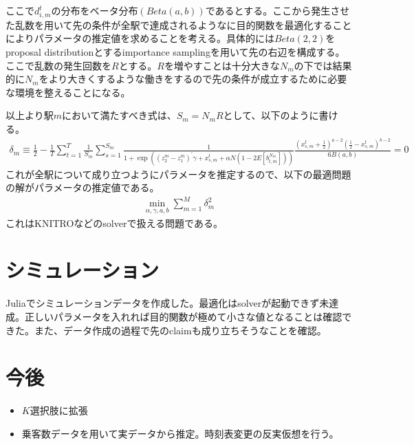 \documentclass{jsarticle}
\begin{document}
ここで$d_{i,m}^t$の分布をベータ分布$(Beta(a, b))$であるとする。ここから発生させた乱数を用いて先の条件が全駅で達成されるようなに目的関数を最適化することによりパラメータの推定値を求めることを考える。具体的には$Beta(2,2)$をproposal distributionとするimportance samplingを用いて先の右辺を構成する。ここで乱数の発生回数を$R$とする。$R$を増やすことは十分大きな$N_m$の下では結果的に$N_m$をより大きくするような働きをするので先の条件が成立するために必要な環境を整えることになる。

以上より駅$m$において満たすべき式は、$S_m = N_m R$として、以下のように書ける。
\begin{align*}
	\delta_m \equiv \frac{1}{2} - \frac{1}{T}\sum_{t = 1}^T \frac{1}{S_m}\sum_{s = 1}^{S_m} \frac{1}{1 + \exp\left( (z_2^m - z_1^m)^{'}\gamma + x_{s,m}^t + \alpha N \left(1 - 2E[b_{t,m}^{N_m}]\right) \right)} \frac{\left(x_{s,m}^t + \frac{1}{2}\right)^{a - 2} \left(\frac{1}{2} - x_{s,m}^t \right)^{b-2}}{6B(a, b)} = 0
\end{align*}
これが全駅について成り立つようにパラメータを推定するので、以下の最適問題の解がパラメータの推定値である。
\begin{align*}
	\min_{\alpha, \gamma, a, b} \sum_{m = 1}^M \delta_m^2
\end{align*}
これはKNITROなどのsolverで扱える問題である。

\section{シミュレーション}
Juliaでシミュレーションデータを作成した。最適化はsolverが起動できず未達成。正しいパラメータを入れれば目的関数が極めて小さな値となることは確認できた。また、データ作成の過程で先のclaimも成り立ちそうなことを確認。

\section{今後}
\begin{itemize}
	\item $K$選択肢に拡張
	\item 乗客数データを用いて実データから推定。時刻表変更の反実仮想を行う。
\end{itemize}
\end{document}
